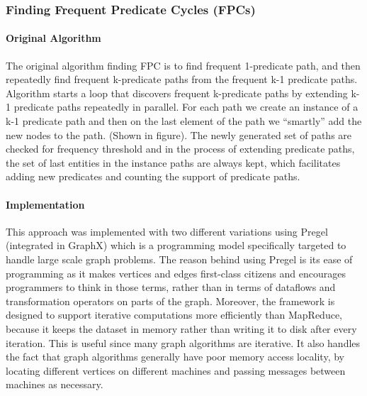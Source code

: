 \documentclass{easychair}
\begin{document}
\subsubsection{Finding Frequent Predicate Cycles (FPCs)}

\paragraph{Original Algorithm}
The original algorithm  finding FPC is to find frequent 1-predicate path, and then repeatedly  find frequent k-predicate paths from the frequent k-1 predicate paths. Algorithm starts a loop that discovers frequent k-predicate paths by extending k-1 predicate paths repeatedly in parallel. For each path  we create an instance of a k-1 predicate path and then on the last element of the path we “smartly” add the new nodes to the path. (Shown in figure). The newly generated set of paths are checked for frequency threshold and in the process of extending predicate paths, the set of last entities in the instance paths are always kept, which facilitates adding new predicates and counting the support of predicate paths. 

\paragraph{Implementation}
This approach \cite{tut} was implemented with two different variations using Pregel \cite{nous} (integrated in GraphX) which is a programming model specifically targeted to handle large scale graph problems. The reason behind using Pregel is its ease of programming as  it makes vertices and edges first-class citizens and encourages programmers to think in those terms, rather than in terms of dataflows and transformation operators on parts of the graph. Moreover, the framework is designed to support iterative computations more efficiently than MapReduce, because it keeps the dataset in memory rather than writing it to disk after every iteration. This is useful since many graph algorithms are iterative. It also handles the fact that graph algorithms generally have poor memory access locality, by locating different vertices on different machines and passing messages between machines as necessary.
\end{document}

